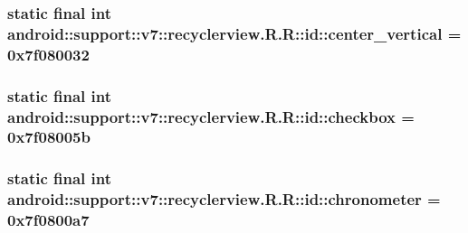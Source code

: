 \hypertarget{classandroid_1_1support_1_1v7_1_1recyclerview_1_1_r_1_1id_3d5288c8aa1ac3eb5e92e25affa82445}{
\subsubsection[{center\_\-vertical}]{\setlength{\rightskip}{0pt plus 5cm}static final int android::support::v7::recyclerview.R.R::id::center\_\-vertical = 0x7f080032}}
\label{classandroid_1_1support_1_1v7_1_1recyclerview_1_1_r_1_1id_3d5288c8aa1ac3eb5e92e25affa82445}


\hypertarget{classandroid_1_1support_1_1v7_1_1recyclerview_1_1_r_1_1id_1ed99db3722dc4b7e122deec737cdb96}{
\subsubsection[{checkbox}]{\setlength{\rightskip}{0pt plus 5cm}static final int android::support::v7::recyclerview.R.R::id::checkbox = 0x7f08005b}}
\label{classandroid_1_1support_1_1v7_1_1recyclerview_1_1_r_1_1id_1ed99db3722dc4b7e122deec737cdb96}


\hypertarget{classandroid_1_1support_1_1v7_1_1recyclerview_1_1_r_1_1id_f58c6a97e27cd384f0b65c1ebf81d145}{
\subsubsection[{chronometer}]{\setlength{\rightskip}{0pt plus 5cm}static final int android::support::v7::recyclerview.R.R::id::chronometer = 0x7f0800a7}}
\label{classandroid_1_1support_1_1v7_1_1recyclerview_1_1_r_1_1id_f58c6a97e27cd384f0b65c1ebf81d145}


